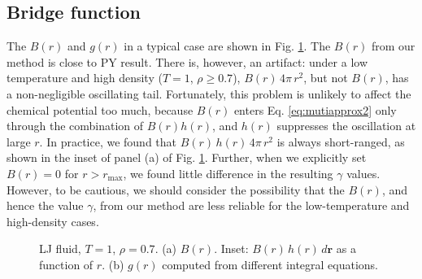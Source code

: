 \documentclass[preprint]{revtex4-1}
\newcommand{\vct}[1]{\mathbf{#1}}
\providecommand{\vr}{} %
\renewcommand{\vr}{\vct{r}}
\begin{document}
\subsection{Bridge function}

The $B(r)$ and $g(r)$ in a typical case are shown in Fig. \ref{fig:ljBrT1rho0.7}.
%
The $B(r)$ from our method is close to PY result.
%
There is, however, an artifact:
under a low temperature and high density ($T = 1$, $\rho \ge 0.7$),
$B(r) \, 4 \pi \, r^2$, but not $B(r)$, has a non-negligible oscillating tail.
%
Fortunately, this problem is unlikely to affect the chemical potential too much,
because $B(r)$ enters Eq. \eqref{eq:mutiapprox2} only through
the combination of $B(r) h(r)$,
and $h(r)$ suppresses the oscillation at large $r$.
%
In practice, we found that $B(r) \, h(r) \, 4 \pi \, r^2$ is always short-ranged,
as shown in the inset of panel (a) of Fig. \ref{fig:ljBrT1rho0.7}.
%
Further, when we explicitly set $B(r) = 0$ for $r > r_\mathrm{max}$,
we found little difference in the resulting $\gamma$ values.
%
However, to be cautious,
we should consider the possibility that the $B(r)$, and hence the value $\gamma$,
from our method are less reliable for the low-temperature and high-density cases.


\begin{figure}[h]
  \caption{
    \label{fig:ljBrT1rho0.7}
    LJ fluid, $T = 1$, $\rho = 0.7$.
    (a) $B(r)$.
    Inset: $B(r) \, h(r) \, d\vr$ as a function of $r$.
    (b) $g(r)$ computed from different integral equations.
  }
\end{figure}
\end{document}
